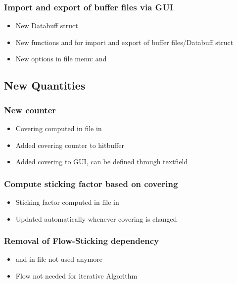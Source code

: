 \subsubsection{Import and export of buffer files via GUI}
\begin{itemize}[noitemsep,topsep=0pt]
\item New Databuff struct 
\item New functions  and  for import and export of buffer files/Databuff struct
\item New options in file menu:  and 
\end{itemize}

\subsection{New Quantities}
\subsubsection{New counter }
\begin{itemize}[noitemsep,topsep=0pt]
\item Covering computed in  file in 
\item Added covering counter to hitbuffer
\item Added covering to GUI, can be defined through textfield
\end{itemize}

\subsubsection{Compute sticking factor based on covering}
\begin{itemize}[noitemsep,topsep=0pt]
\item Sticking factor computed in  file in 
\item Updated automatically whenever covering is changed
\end{itemize}

\subsubsection{Removal of Flow-Sticking dependency}
\begin{itemize}[noitemsep,topsep=0pt]
\item {} and  in  file not used anymore
\item Flow not needed for iterative Algorithm
\end{itemize}

